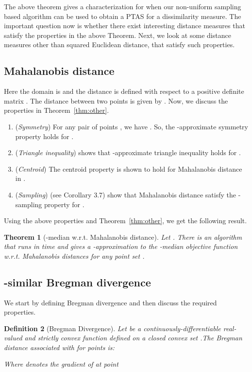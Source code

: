 \documentclass[a4paper]{article}
\newtheorem{theorem}{Theorem}
\newtheorem{definition}[theorem]{Definition}
\begin{document}
The above theorem gives a characterization for when our non-uniform sampling based algorithm can be used to obtain a PTAS for a dissimilarity measure. The important question now is whether there exist interesting distance measures that satisfy the properties in the above Theorem. Next, we look at some distance measures other than squared Euclidean distance, that satisfy such properties.

\subsection{Mahalanobis distance}

Here the domain is  and the distance is defined with respect to a positive definite matrix . The distance between two points  is given by . Now, we discuss the properties in Theorem~\ref{thm:other}.
\begin{enumerate}
\item ({\it Symmetry}) For any pair of points , we have . So, the -approximate symmetry property holds for .

\item ({\it Triangle inequality}) \cite{ab09} shows that -approximate triangle inequality holds for .

\item ({\it Centroid}) The centroid property is shown to hold for Mahalanobis distance in \cite{ban05}.

\item ({\it Sampling}) \cite{abs10} (see Corollary 3.7) show that Mahalanobis distance satisfy the -sampling property for .
\end{enumerate}

\noindent
Using the above properties and Theorem~\ref{thm:other}, we get the following result.

\begin{theorem}[-median w.r.t. Mahalanobis distance]
Let . There is an algorithm that runs in time  and gives a -approximation to the -median objective function w.r.t. Mahalanobis distances for any point set .
\end{theorem}

\subsection{-similar Bregman divergence}

We start by defining Bregman divergence and then discuss the required properties.

\begin{definition}[Bregman Divergence]
Let  be a continuously-differentiable real-valued and strictly convex function defined on a closed convex set .The Bregman distance associated with  for points   is:

Where  denotes the gradient of  at point 
\end{definition}
\end{document}
